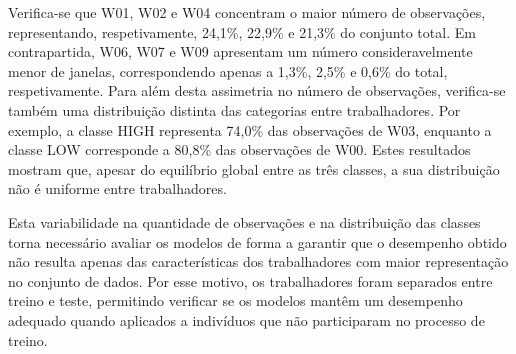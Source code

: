 \begin{table}[H]
\centering
\caption{Número de janelas disponíveis por trabalhador.}
\label{tab:distribuicao_trabalhadores}
\tiny
\setlength{\tabcolsep}{2pt}
%
\end{table}

Verifica-se que W01, W02 e W04 concentram o maior número de observações, representando, respetivamente, 24,1\%, 22,9\% e 21,3\% do conjunto total. Em contrapartida, W06, W07 e W09 apresentam um número consideravelmente menor de janelas, correspondendo apenas a 1,3\%, 2,5\% e 0,6\% do total, respetivamente. Para além desta assimetria no número de observações, verifica-se também uma distribuição distinta das categorias entre trabalhadores. Por exemplo, a classe HIGH representa 74,0\% das observações de W03, enquanto a classe LOW corresponde a 80,8\% das observações de W00. Estes resultados mostram que, apesar do equilíbrio global entre as três classes, a sua distribuição não é uniforme entre trabalhadores.

Esta variabilidade na quantidade de observações e na distribuição das classes torna necessário avaliar os modelos de forma a garantir que o desempenho obtido não resulta apenas das características dos trabalhadores com maior representação no conjunto de dados. Por esse motivo, os trabalhadores foram separados entre treino e teste, permitindo verificar se os modelos mantêm um desempenho adequado quando aplicados a indivíduos que não participaram no processo de treino.

